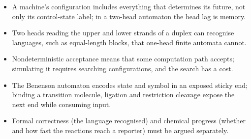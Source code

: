 \begin{KeyIdeas}
\begin{itemize}\setlength{\itemsep}{2pt}
\item A machine's configuration includes everything that determines its future,
not only its control-state label; in a two-head automaton the head lag is
memory.
\item Two heads reading the upper and lower strands of a duplex can recognise
languages, such as equal-length blocks, that one-head finite automata cannot.
\item Nondeterministic acceptance means that some computation path accepts;
simulating it requires searching configurations, and the search has a cost.
\item The Benenson automaton encodes state and symbol in an exposed sticky end;
binding a transition molecule, ligation and restriction cleavage expose the next
end while consuming input.
\item Formal correctness (the language recognised) and chemical progress
(whether and how fast the reactions reach a reporter) must be argued separately.
\end{itemize}
\end{KeyIdeas}

